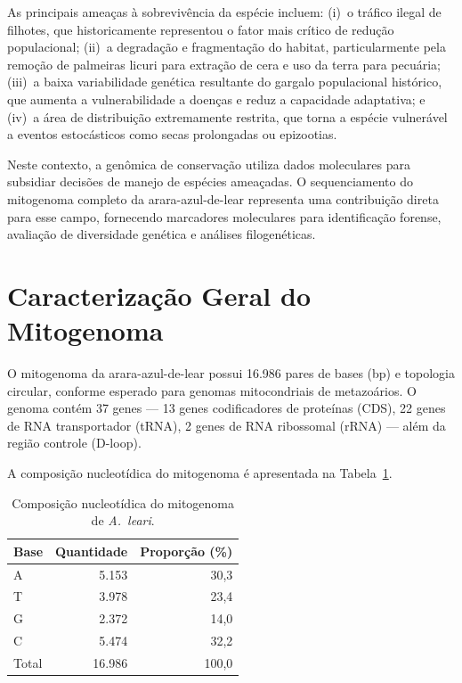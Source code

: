 As principais ameaças à sobrevivência da espécie incluem: (i)~o tráfico ilegal de filhotes, que historicamente representou o fator mais crítico de redução populacional; (ii)~a degradação e fragmentação do habitat, particularmente pela remoção de palmeiras licuri para extração de cera e uso da terra para pecuária; (iii)~a baixa variabilidade genética resultante do gargalo populacional histórico, que aumenta a vulnerabilidade a doenças e reduz a capacidade adaptativa; e (iv)~a área de distribuição extremamente restrita, que torna a espécie vulnerável a eventos estocásticos como secas prolongadas ou epizootias.

Neste contexto, a genômica de conservação utiliza dados moleculares para subsidiar decisões de manejo de espécies ameaçadas. O sequenciamento do mitogenoma completo da arara-azul-de-lear representa uma contribuição direta para esse campo, fornecendo marcadores moleculares para identificação forense, avaliação de diversidade genética e análises filogenéticas.



\section{Caracterização Geral do Mitogenoma}
\label{sec:caracterizacao}

O mitogenoma da arara-azul-de-lear possui 16.986 pares de bases (bp) e topologia circular, conforme esperado para genomas mitocondriais de metazoários. O genoma contém 37 genes --- 13 genes codificadores de proteínas (CDS), 22 genes de RNA transportador (tRNA), 2 genes de RNA ribossomal (rRNA) --- além da região controle (D-loop).

A composição nucleotídica do mitogenoma é apresentada na Tabela~\ref{tab:composicao_nt}.

\begin{table}[H]
\centering
\caption{Composição nucleotídica do mitogenoma de \textit{A.~leari}.}
\label{tab:composicao_nt}
\begin{tabular}{@{}lrr@{}}
\toprule
\textbf{Base} & \textbf{Quantidade} & \textbf{Proporção (\%)} \\
\midrule
A & 5.153 & 30,3 \\
T & 3.978 & 23,4 \\
G & 2.372 & 14,0 \\
C & 5.474 & 32,2 \\
\midrule
Total & 16.986 & 100,0 \\
\bottomrule
\end{tabular}
\end{table}

